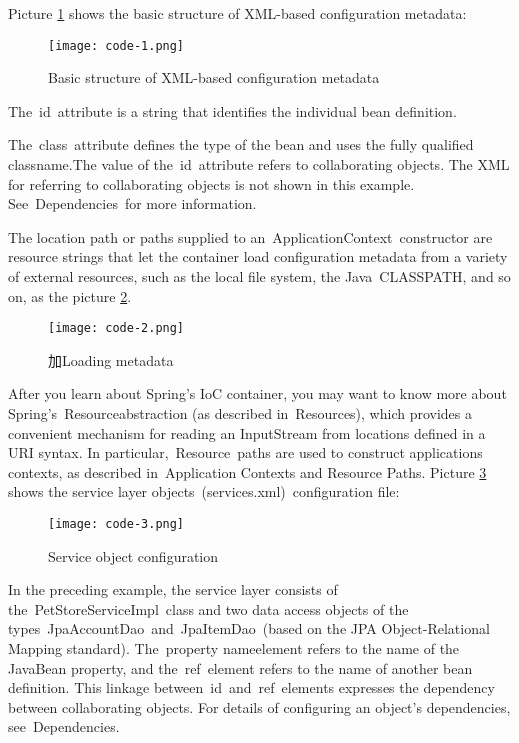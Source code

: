 Picture \ref{fig:spring-code-1-en} shows the basic structure of XML-based configuration metadata:

\begin{figure}[!ht]
  \centering
  \texttt{[image: code-1.png]}
  \caption{Basic structure of XML-based configuration metadata}
  \label{fig:spring-code-1-en}
\end{figure}


The id attribute is a string that identifies the individual bean definition.

The class attribute defines the type of the bean and uses the fully qualified classname.The value of the id attribute refers to collaborating objects. The XML for referring to collaborating objects is not shown in this example. See Dependencies for more information.

The location path or paths supplied to an ApplicationContext constructor are resource strings that let the container load configuration metadata from a variety of external resources, such as the local file system, the Java CLASSPATH, and so on, as the picture \ref{fig:spring-code-2-en}.

\begin{figure}[!ht]
  \centering
  \texttt{[image: code-2.png]}
  \caption{加Loading metadata}
  \label{fig:spring-code-2-en}
\end{figure}


After you learn about Spring’s IoC container, you may want to know more about Spring’s Resourceabstraction (as described in Resources), which provides a convenient mechanism for reading an InputStream from locations defined in a URI syntax. In particular, Resource paths are used to construct applications contexts, as described in Application Contexts and Resource Paths.
Picture \ref{fig:spring-code-3-en} shows the service layer objects (services.xml) configuration file:

\begin{figure}[!ht]
  \centering
  \texttt{[image: code-3.png]}
  \caption{Service object configuration}
  \label{fig:spring-code-3-en}
\end{figure}

In the preceding example, the service layer consists of the PetStoreServiceImpl class and two data access objects of the types JpaAccountDao and JpaItemDao (based on the JPA Object-Relational Mapping standard). The property nameelement refers to the name of the JavaBean property, and the ref element refers to the name of another bean definition. This linkage between id and ref elements expresses the dependency between collaborating objects. For details of configuring an object’s dependencies, see Dependencies.

